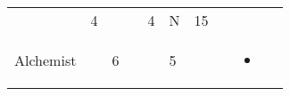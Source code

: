 \documentclass[12pt]{article}
\begin{document}
\begin{longtable}[]{@{}llllllllll@{}}
\begin{minipage}[t]{0.06\columnwidth}
\strut\end{minipage} &
\begin{minipage}[t]{0.06\columnwidth}\raggedright\strut
4
\strut\end{minipage} &
\begin{minipage}[t]{0.06\columnwidth}\raggedright\strut
\strut\end{minipage} &
\begin{minipage}[t]{0.06\columnwidth}\raggedright\strut
\strut\end{minipage} &
\begin{minipage}[t]{0.06\columnwidth}\raggedright\strut
4
\strut\end{minipage} &
\begin{minipage}[t]{0.07\columnwidth}\raggedright\strut
N
\strut\end{minipage} &
\begin{minipage}[t]{0.08\columnwidth}\raggedright\strut
15
\strut\end{minipage}\tabularnewline
\begin{minipage}[t]{0.13\columnwidth}\raggedright\strut
Alchemist
\strut\end{minipage} &
\begin{minipage}[t]{0.06\columnwidth}\raggedright\strut
\strut\end{minipage} &
\begin{minipage}[t]{0.06\columnwidth}\raggedright\strut
6
\strut\end{minipage} &
\begin{minipage}[t]{0.06\columnwidth}\raggedright\strut
\strut\end{minipage} &
\begin{minipage}[t]{0.06\columnwidth}\raggedright\strut
\strut\end{minipage} &
\begin{minipage}[t]{0.06\columnwidth}\raggedright\strut
5
\strut\end{minipage} &
\begin{minipage}[t]{0.06\columnwidth}\raggedright\strut
\strut\end{minipage} &
\begin{minipage}[t]{0.06\columnwidth}\raggedright\strut
\strut\end{minipage} &
\begin{minipage}[t]{0.07\columnwidth}\raggedright\strut
\begin{itemize}
\item
\end{itemize}
\strut\end{minipage} &

\end{longtable}
\end{document}
